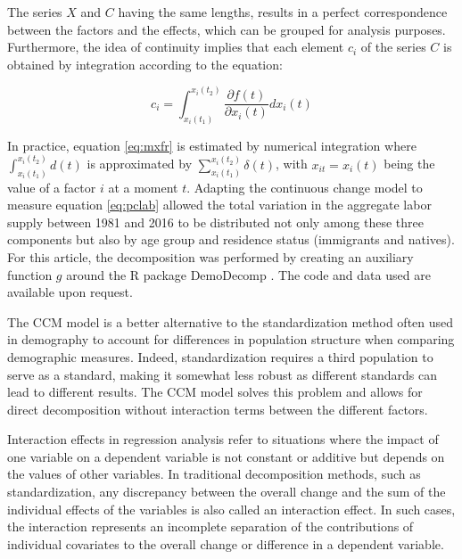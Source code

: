 The series \(X\) and \(C\) having the same lengths, results in a perfect correspondence between the factors and the effects, which can be grouped for analysis purposes. Furthermore, the idea of continuity implies that each element \(c_i\) of the series \(C\) is obtained by integration according to the equation:

\begin{equation}\label{eq:mxfr}
    c_i = \int_{x_i(t_1)}^{x_i(t_2)} \frac{\partial f(t)}{\partial x_i(t)} dx_i(t)
\end{equation}

In practice, equation \eqref{eq:mxfr} is estimated by numerical integration where \(\int_{x_i(t_1)}^{x_i(t_2)} d(t)\) is approximated by \(\sum_{x_i(t_1)}^{x_i(t_2)} \delta(t)\), with \(x_{it} = x_i(t)\) being the value of a factor \(i\) at a moment \(t\). Adapting the continuous change model to measure equation \eqref{eq:pclab} allowed the total variation in the aggregate labor supply between 1981 and 2016 to be distributed not only among these three components but also by age group and residence status (immigrants and natives). For this article, the decomposition was performed by creating an auxiliary function \(g\) around the R package \citep{Rstat:2018} DemoDecomp \citep{DemoDecomp:2018}. The code and data used are available upon request.

\vspace{0.7em}\par
The CCM model is a better alternative to the standardization method often used in demography to account for differences in population structure when comparing demographic measures. Indeed, standardization requires a third population to serve as a standard, making it somewhat less robust as different standards can lead to different results. The CCM model solves this problem and allows for direct decomposition without interaction terms between the different factors.

Interaction effects in regression analysis refer to situations where the impact of one variable on a dependent variable is not constant or additive but depends on the values of other variables. In traditional decomposition methods, such as standardization, any discrepancy between the overall change and the sum of the individual effects of the variables is also called an interaction effect. In such cases, the interaction represents an incomplete separation of the contributions of individual covariates to the overall change or difference in a dependent variable.


